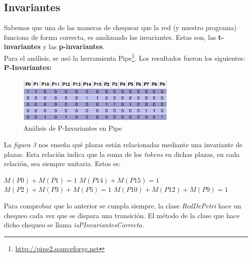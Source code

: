 \documentclass{article}
\newcommand{\fnpipe}{\url{http://pipe2.sourceforge.net}}
\begin{document}
    \subsection{Invariantes}
    \begin{flushleft}
        Sabemos que una de las maneras de chequear que la red (y nuestro programa) funciona 
        de forma correcta, es analizando las invariantes. Estas son, las \textbf{t-invariantes}
        y las \textbf{p-invariantes}. \\
        Para el análisis, se usó la herramienta Pipe\footnote{\fnpipe}.
        Los resultados fueron los siguientes: \newline \newline
        \textbf{P-Invariantes:} \\
        \begin{figure}[h]
            \includegraphics[width=0.7\textwidth, center]{p-invariante.png}
            \caption{Análisis de P-Invariantes en Pipe}
        \end{figure}
        La \emph{figura 3} nos enseña qué plazas están relacionadas mediante una invariante de
        plazas. Esta relación indica que la suma de los \emph{tokens} en dichas plazas, en cada
        relación, sea siempre unitaria. Estos es: \newline \newline
        \begin{center}
            $M(P0) + M(P1) = 1$ \newline \newline
            $M(P14) + M(P15) = 1$ \newline \newline
            $M(P2) + M(P3) + M(P5) = 1$ \newline \newline
            $M(P10) + M(P12) + M(P9) = 1$ \newline \newline
        \end{center}
        Para comprobar que lo anterior se cumpla siempre, la clase \emph{RedDePetri} hace un 
        chequeo cada vez que se dispara una transición. El método de la clase que hace dicho
        chequeo se llama \emph{isPInvariantesCorrecto}. \newline \newline

\end{flushleft}
\end{document}
